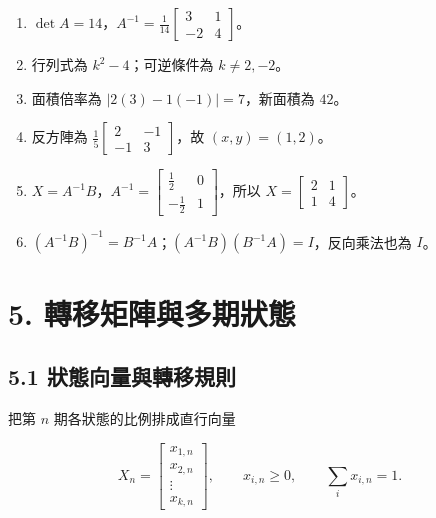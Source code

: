 \documentclass[11pt,a4paper]{article}
\providecommand{\tightlist}{%
  \setlength{\itemsep}{0pt}\setlength{\parskip}{0pt}}
\begin{document}
\begin{HandoutSelfCheck}
\begin{enumerate}
\def\labelenumi{\arabic{enumi}.}
\tightlist
\item
  \(\det A=14\)，\(\boxed{A^{-1}=\frac1{14}\begin{bmatrix}3&1\\-2&4\end{bmatrix}}\)。
\item
  行列式為 \(k^2-4\)；可逆條件為 \(\boxed{k\ne2,-2}\)。
\item
  面積倍率為 \(|2(3)-1(-1)|=7\)，新面積為 \(\boxed{42}\)。
\item
  反方陣為 \(\frac15\begin{bmatrix}2&-1\\-1&3\end{bmatrix}\)，故 \(\boxed{(x,y)=(1,2)}\)。
\item
  \(X=A^{-1}B\)，\(A^{-1}=\begin{bmatrix}\tfrac12&0\\-\tfrac12&1\end{bmatrix}\)，所以 \(\boxed{X=\begin{bmatrix}2&1\\1&4\end{bmatrix}}\)。
\item
  \(\boxed{(A^{-1}B)^{-1}=B^{-1}A}\)；\((A^{-1}B)(B^{-1}A)=I\)，反向乘法也為 \(I\)。
\end{enumerate}

\end{HandoutSelfCheck}

\section{5. 轉移矩陣與多期狀態}\label{ux8f49ux79fbux77e9ux9663ux8207ux591aux671fux72c0ux614b}

\subsection{5.1 狀態向量與轉移規則}\label{ux72c0ux614bux5411ux91cfux8207ux8f49ux79fbux898fux5247}

把第 \(n\) 期各狀態的比例排成直行向量

\[
X_n=\begin{bmatrix}x_{1,n}\\x_{2,n}\\\vdots\\x_{k,n}\end{bmatrix},
\qquad
x_{i,n}\ge0,\qquad
\sum_i x_{i,n}=1.
\]
\end{document}
